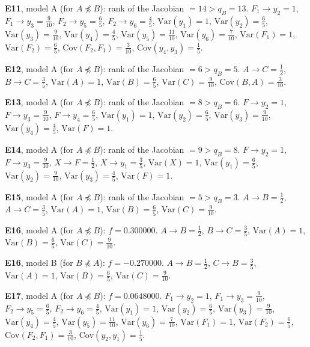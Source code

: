 \documentclass[10pt,a4paper]{article}
\newcommand{\nnest}{\not\preceq}
\begin{document}
{\noindent\textbf{E11}, model A (for $A\nnest B$): rank of the Jacobian $=14>q_B=13$. {\footnotesize $F_{1}\to y_{2}=1$, $F_{1}\to y_{3}=\tfrac{9}{10}$, $F_{2}\to y_{5}=\tfrac{6}{5}$, $F_{2}\to y_{6}=\tfrac{4}{5}$, $\mathrm{Var}(y_{1})=1$, $\mathrm{Var}(y_{2})=\tfrac{6}{5}$, $\mathrm{Var}(y_{3})=\tfrac{9}{10}$, $\mathrm{Var}(y_{4})=\tfrac{4}{5}$, $\mathrm{Var}(y_{5})=\tfrac{11}{10}$, $\mathrm{Var}(y_{6})=\tfrac{7}{10}$, $\mathrm{Var}(F_{1})=1$, $\mathrm{Var}(F_{2})=\tfrac{6}{5}$, $\mathrm{Cov}(F_{2},F_{1})=\tfrac{3}{10}$, $\mathrm{Cov}(y_{4},y_{3})=\tfrac{1}{5}$.}\par\smallskip
\noindent\textbf{E12}, model A (for $A\nnest B$): rank of the Jacobian $=6>q_B=5$. {\footnotesize $A\to C=\tfrac{1}{2}$, $B\to C=\tfrac{3}{5}$, $\mathrm{Var}(A)=1$, $\mathrm{Var}(B)=\tfrac{6}{5}$, $\mathrm{Var}(C)=\tfrac{9}{10}$, $\mathrm{Cov}(B,A)=\tfrac{3}{10}$.}\par\smallskip
\noindent\textbf{E13}, model A (for $A\nnest B$): rank of the Jacobian $=8>q_B=6$. {\footnotesize $F\to y_{2}=1$, $F\to y_{3}=\tfrac{9}{10}$, $F\to y_{4}=\tfrac{6}{5}$, $\mathrm{Var}(y_{1})=1$, $\mathrm{Var}(y_{2})=\tfrac{6}{5}$, $\mathrm{Var}(y_{3})=\tfrac{9}{10}$, $\mathrm{Var}(y_{4})=\tfrac{4}{5}$, $\mathrm{Var}(F)=1$.}\par\smallskip
\noindent\textbf{E14}, model A (for $A\nnest B$): rank of the Jacobian $=9>q_B=8$. {\footnotesize $F\to y_{2}=1$, $F\to y_{3}=\tfrac{9}{10}$, $X\to F=\tfrac{1}{2}$, $X\to y_{1}=\tfrac{3}{5}$, $\mathrm{Var}(X)=1$, $\mathrm{Var}(y_{1})=\tfrac{6}{5}$, $\mathrm{Var}(y_{2})=\tfrac{9}{10}$, $\mathrm{Var}(y_{3})=\tfrac{4}{5}$, $\mathrm{Var}(F)=1$.}\par\smallskip
\noindent\textbf{E15}, model A (for $A\nnest B$): rank of the Jacobian $=5>q_B=3$. {\footnotesize $A\to B=\tfrac{1}{2}$, $A\to C=\tfrac{3}{5}$, $\mathrm{Var}(A)=1$, $\mathrm{Var}(B)=\tfrac{6}{5}$, $\mathrm{Var}(C)=\tfrac{9}{10}$.}\par\smallskip
\noindent\textbf{E16}, model A (for $A\nnest B$): $f=0.300000$. {\footnotesize $A\to B=\tfrac{1}{2}$, $B\to C=\tfrac{3}{5}$, $\mathrm{Var}(A)=1$, $\mathrm{Var}(B)=\tfrac{6}{5}$, $\mathrm{Var}(C)=\tfrac{9}{10}$.}\par\smallskip
\noindent\textbf{E16}, model B (for $B\nnest A$): $f=-0.270000$. {\footnotesize $A\to B=\tfrac{1}{2}$, $C\to B=\tfrac{3}{5}$, $\mathrm{Var}(A)=1$, $\mathrm{Var}(B)=\tfrac{6}{5}$, $\mathrm{Var}(C)=\tfrac{9}{10}$.}\par\smallskip
\noindent\textbf{E17}, model A (for $A\nnest B$): $f=0.0648000$. {\footnotesize $F_{1}\to y_{2}=1$, $F_{1}\to y_{3}=\tfrac{9}{10}$, $F_{2}\to y_{5}=\tfrac{6}{5}$, $F_{2}\to y_{6}=\tfrac{4}{5}$, $\mathrm{Var}(y_{1})=1$, $\mathrm{Var}(y_{2})=\tfrac{6}{5}$, $\mathrm{Var}(y_{3})=\tfrac{9}{10}$, $\mathrm{Var}(y_{4})=\tfrac{4}{5}$, $\mathrm{Var}(y_{5})=\tfrac{11}{10}$, $\mathrm{Var}(y_{6})=\tfrac{7}{10}$, $\mathrm{Var}(F_{1})=1$, $\mathrm{Var}(F_{2})=\tfrac{6}{5}$, $\mathrm{Cov}(F_{2},F_{1})=\tfrac{3}{10}$, $\mathrm{Cov}(y_{2},y_{1})=\tfrac{1}{5}$.}\par\smallskip
}
\end{document}
